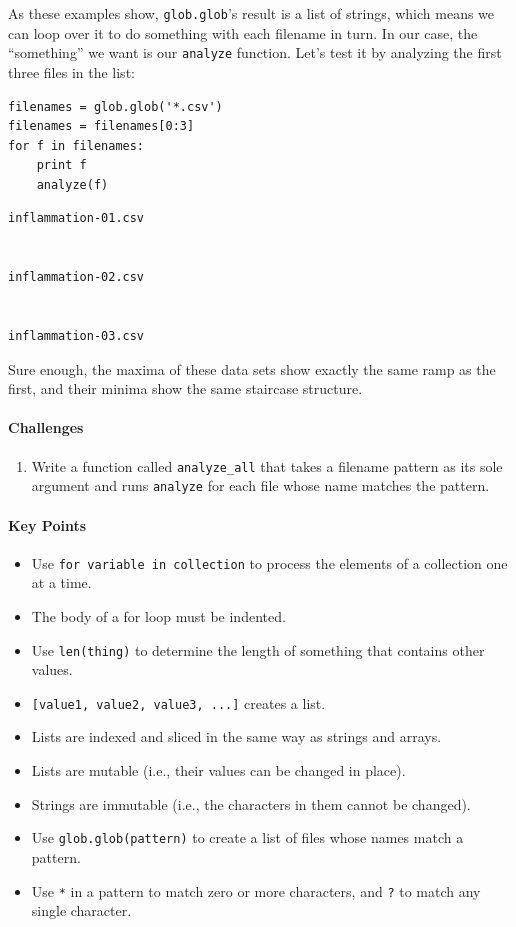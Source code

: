 \documentclass[]{book}
\begin{document}
As these examples show, \texttt{glob.glob}'s result is a list of
strings, which means we can loop over it to do something with each
filename in turn. In our case, the ``something'' we want is our
\texttt{analyze} function. Let's test it by analyzing the first three
files in the list:

\begin{verbatim}
filenames = glob.glob('*.csv')
filenames = filenames[0:3]
for f in filenames:
    print f
    analyze(f)
\end{verbatim}

\begin{verbatim}
inflammation-01.csv


inflammation-02.csv


inflammation-03.csv

\end{verbatim}

Sure enough, the maxima of these data sets show exactly the same ramp as
the first, and their minima show the same staircase structure.

\mbox{}\paragraph{Challenges}

\begin{enumerate}
\item
  Write a function called \texttt{analyze\_all} that takes a filename
  pattern as its sole argument and runs \texttt{analyze} for each file
  whose name matches the pattern.
\end{enumerate}

\mbox{}\paragraph{Key Points}

\begin{itemize}
\item
  Use \texttt{for variable in collection} to process the elements of a
  collection one at a time.
\item
  The body of a for loop must be indented.
\item
  Use \texttt{len(thing)} to determine the length of something that
  contains other values.
\item
  \texttt{{[}value1, value2, value3, ...{]}} creates a list.
\item
  Lists are indexed and sliced in the same way as strings and arrays.
\item
  Lists are mutable (i.e., their values can be changed in place).
\item
  Strings are immutable (i.e., the characters in them cannot be
  changed).
\item
  Use \texttt{glob.glob(pattern)} to create a list of files whose names
  match a pattern.
\item
  Use \texttt{*} in a pattern to match zero or more characters, and
  \texttt{?} to match any single character.
\end{itemize}
\end{document}

